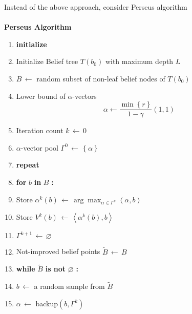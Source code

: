 \documentclass[a4paper,onecolumn]{article}
\begin{document}
\vspace{1cm}
\noindent Instead of the above approach, consider {Perseus}
algorithm\\
\hspace{0.1cm}\\
\textbf{Perseus Algorithm}
\begin{enumerate}
    \item \textbf{initialize}
	\item \hspace{1cm} Initialize Belief tree $T(b_0)$ with maximum
	depth $L$
	\item \hspace{1cm} $B\,\leftarrow$ random subset of non-leaf belief nodes of
	$T(b_0)$
	\item \hspace{1cm} Lower bound of $\alpha$-vectors 
	\begin{equation}
	    \alpha \leftarrow \frac{\min\left\{r\right\}}{1-\gamma}(1,1)
	\end{equation}
	\item \hspace{1cm} Iteration count $k\,\leftarrow\,0$
	\item \hspace{1cm} $\alpha$-vector pool $\Gamma^0\,\leftarrow\,
	\left\{\alpha\right\}$
	\item \textbf{repeat}
	\item \hspace{1cm} \textbf{for} $b$ \textbf{in} $B$ \textbf{:}
	\item \hspace{2cm} Store
	$\alpha^k(b)\,\leftarrow\,\arg\max_{\alpha\in\Gamma^k} \left<\alpha,
	b\right>$
	\item \hspace{2cm} Store $V^k(b)\,\leftarrow\,\left<\alpha^k(b),b\right>$
	\item \hspace{1cm} $\Gamma^{k+1}\,\leftarrow\,\varnothing$
	\item \hspace{1cm} Not-improved belief points $\tilde{B}\,\leftarrow\, B$
	\item \hspace{1cm} \textbf{while} $\tilde{B}$ \textbf{is not} $\varnothing$
	\textbf{:}
	\item \hspace{2cm} $b\,\leftarrow$ a random sample from $\tilde{B}$
	\item \hspace{2cm} $\alpha\,\leftarrow$ backup$(b,\Gamma^k)$

\end{enumerate}
\end{document}
